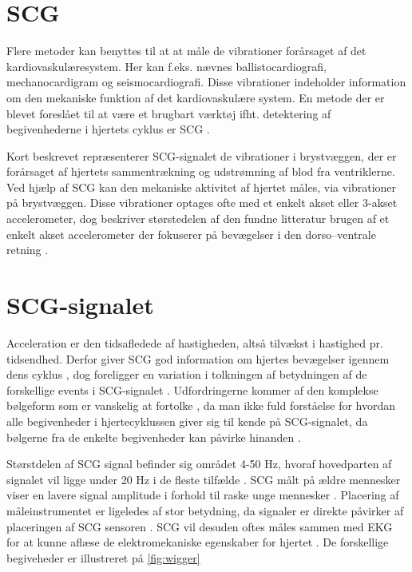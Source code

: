 \section{SCG}
Flere metoder kan benyttes til at at måle de vibrationer forårsaget af det kardiovaskulæresystem. Her kan f.eks. nævnes ballistocardiografi, mechanocardigram og seismocardiografi. Disse vibrationer indeholder information om den mekaniske funktion af det kardiovaskulære system. En metode der er blevet foreslået til at være et brugbart værktøj ifht. detektering af begivenhederne i hjertets cyklus er SCG \cite{phd}. 

Kort beskrevet repræsenterer SCG-signalet de vibrationer i brystvæggen, der er forårsaget af hjertets sammentrækning og udstrømning af blod fra ventriklerne. Ved hjælp af  SCG kan den mekaniske aktivitet af hjertet måles, via vibrationer på brystvæggen. Disse vibrationer optages ofte med et enkelt akset eller 3-akset accelerometer, dog beskriver størstedelen af den fundne litteratur  brugen af et enkelt akset accelerometer der fokuserer på bevægelser i den dorso–ventrale retning \cite{Recent_Advances}.

\section{SCG-signalet}
Acceleration er den tidsafledede af hastigheden, altså tilvækst i hastighed pr. tidsendhed. Derfor giver SCG god information om hjertes bevægelser igennem dens cyklus \cite{performance}, dog  foreligger en variation i tolkningen af betydningen af de forskellige events i SCG-signalet \cite{phd}. Udfordringerne kommer af den komplekse bølgeform som er vanskelig at fortolke \cite{zanetti}, da man ikke fuld forståelse for hvordan alle begivenheder i hjertecyklussen giver sig til kende på SCG-signalet, da bølgerne fra de enkelte begivenheder kan påvirke hinanden \cite{abra}.

Størstdelen af SCG signal befinder sig området 4-50 Hz, hvoraf hovedparten af signalet vil ligge under 20 Hz i de fleste tilfælde \cite{phd}. 
 SCG målt på ældre mennesker viser en lavere signal amplitude i forhold til raske unge mennesker \cite{Recent_Advances}. Placering af måleinstrumentet er ligeledes af stor betydning, da signaler er direkte påvirker af placeringen af SCG sensoren \cite{zanetti}. SCG vil desuden oftes måles sammen med EKG for at kunne aflæse de elektromekaniske egenskaber for hjertet \cite{abra}. De forskellige begiveheder er illustreret på  \ref{fig:wigger}


